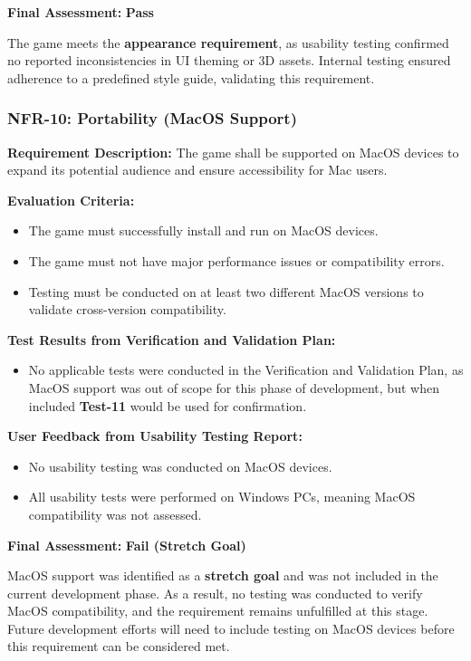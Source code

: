 \documentclass[12pt, titlepage]{article}
\begin{document}
\textbf{Final Assessment:} \textbf{Pass}  

The game meets the \textbf{appearance requirement}, as usability testing confirmed no reported inconsistencies in UI theming or 3D assets. Internal testing ensured adherence to a predefined style guide, validating this requirement.


\subsubsection{NFR-10: Portability (MacOS Support)}
\label{NFR10}

\textbf{Requirement Description:}  
The game shall be supported on MacOS devices to expand its potential audience and ensure accessibility for Mac users.

\textbf{Evaluation Criteria:}  
\begin{itemize}
    \item The game must successfully install and run on MacOS devices.
    \item The game must not have major performance issues or compatibility errors.
    \item Testing must be conducted on at least two different MacOS versions to validate cross-version compatibility.
\end{itemize}

\textbf{Test Results from Verification and Validation Plan:}  
\begin{itemize}
    \item No applicable tests were conducted in the Verification and Validation Plan, as MacOS support was out of scope for this phase of development, but when included \textbf{Test-11} would be used for confirmation.
\end{itemize}

\textbf{User Feedback from Usability Testing Report:}  
\begin{itemize}
    \item No usability testing was conducted on MacOS devices.
    \item All usability tests were performed on Windows PCs, meaning MacOS compatibility was not assessed.
\end{itemize}

\textbf{Final Assessment:} \textbf{Fail (Stretch Goal)}  

MacOS support was identified as a \textbf{stretch goal} and was not included in the current development phase. As a result, no testing was conducted to verify MacOS compatibility, and the requirement remains unfulfilled at this stage. Future development efforts will need to include testing on MacOS devices before this requirement can be considered met.
\end{document}
